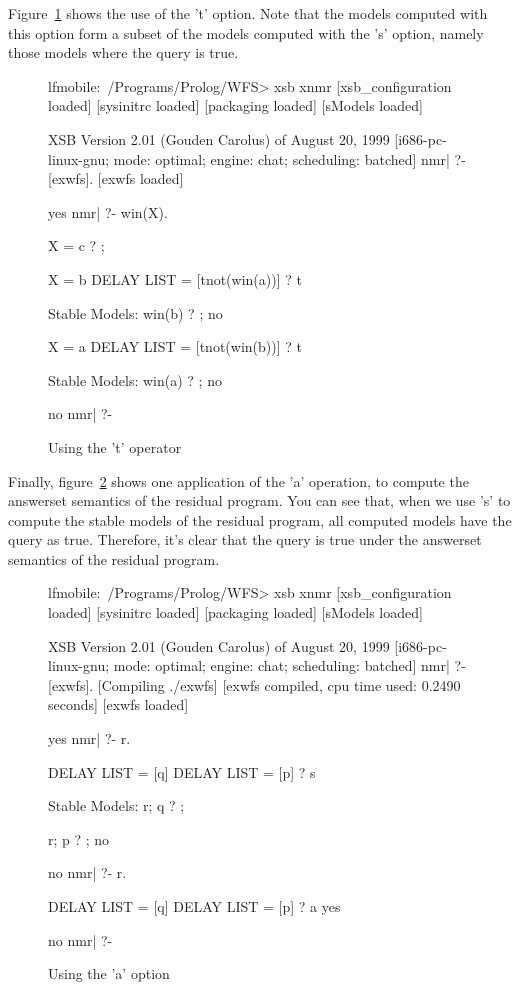 \documentclass{article}
\begin{document}
Figure~\ref{fig:tstable} shows the use of the 't' option. Note that
the models computed with this option form a subset of the models
computed with the 's' option, namely those models where the query is
true.

\begin{figure}
\label{fig:tstable}
\centering
\scriptsize
\begin{boxedverbatim}
lfmobile:~/Programs/Prolog/WFS> xsb xnmr
[xsb_configuration loaded]
[sysinitrc loaded]
[packaging loaded]
[sModels loaded]

XSB Version 2.01 (Gouden Carolus) of August 20, 1999
[i686-pc-linux-gnu; mode: optimal; engine: chat; scheduling: batched]
nmr| ?- [exwfs].
[exwfs loaded]

yes
nmr| ?- win(X).

X = c ? ;

X = b
DELAY LIST = [tnot(win(a))] ? t

Stable Models: 
  {win(b)} ? ;
  no

X = a
DELAY LIST = [tnot(win(b))] ? t

Stable Models: 
  {win(a)} ? ;
  no

no
nmr| ?- 
\end{boxedverbatim}
\caption{Using the 't' operator}
\end{figure}

Finally, figure~\ref{fig:answerset} shows one application of the 'a'
operation, to compute the answerset semantics of the residual
program. You can see that, when we use 's' to compute the stable
models of the residual program, all computed models have the query as
true. Therefore, it's clear that the query is true under the answerset
semantics of the residual program. 

\begin{figure}
\label{fig:answerset}
\centering
\scriptsize
\begin{boxedverbatim}
lfmobile:~/Programs/Prolog/WFS> xsb xnmr
[xsb_configuration loaded]
[sysinitrc loaded]
[packaging loaded]
[sModels loaded]

XSB Version 2.01 (Gouden Carolus) of August 20, 1999
[i686-pc-linux-gnu; mode: optimal; engine: chat; scheduling: batched]
nmr| ?- [exwfs].
[Compiling ./exwfs]
[exwfs compiled, cpu time used: 0.2490 seconds]
[exwfs loaded]

yes
nmr| ?- r.

DELAY LIST = [q]
DELAY LIST = [p] ? s

Stable Models: 
  {r; q} ? ;

  {r; p} ? ;
  no

no
nmr| ?- r.

DELAY LIST = [q]
DELAY LIST = [p] ? a
  yes

no
nmr| ?- 
\end{boxedverbatim}
\caption{Using the 'a' option}
\end{figure}
\end{document}
